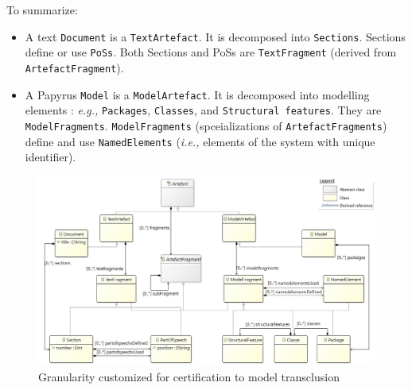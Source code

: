 To summarize:
\begin{itemize}
    \item A text \texttt{Document} is a \texttt{TextArtefact}. It is decomposed into \texttt{Sections}. Sections define or use \texttt{PoSs}. Both Sections and PoSs are \texttt{TextFragment} (derived from \texttt{ArtefactFragment}).
    \item A Papyrus \texttt{Model} is a \texttt{ModelArtefact}. It is decomposed into modelling elements : \textit{e.g.,} \texttt{Packages}, \texttt{Classes}, and \texttt{Structural features}. They are \texttt{ModelFragments}. \texttt{ModelFragments} (spceializations of \texttt{ArtefactFragments}) define and use \texttt{NamedElements} (\textit{i.e.,} elements of the system with unique identifier). 
\end{itemize}
\begin{figure}[ht]
	\centering
	\includegraphics[width=.99\linewidth]{images/granularity-re.jpg}
	\caption{Granularity customized for certification to model transclusion}
	\label{fig:mm-granularity-re}
\end{figure}
